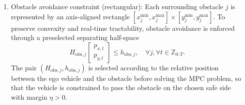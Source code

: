 \documentclass[pdflatex,sn-mathphys,Numbered]{sn-jnl}
\numberwithin{equation}{section}
\begin{document}
	\begin{enumerate}
		\item[i)] {Obstacle avoidance constraint (rectangular):}  
		Each surrounding obstacle \(j\) is represented by an axis-aligned rectangle
		\([
		x_j^{\min}, x_j^{\max}] \times [y_j^{\min}, y_j^{\max}]
		\).
		To preserve convexity and real-time tractability, obstacle avoidance is enforced through a preselected separating half-space
		\begin{equation}
			H_{\text{obs},j}
			\begin{bmatrix}
				p_{x,t} \\
				p_{y,t}
			\end{bmatrix}
			\le h_{\text{obs},j},
			\quad \forall j, \forall t \in \mathbb{Z}_{0:T}.
			\label{equ:sec2_obstacle_halfspace}
		\end{equation}
		The pair \((H_{\text{obs},j}, h_{\text{obs},j})\) is selected according to the relative position between the ego vehicle and the obstacle before solving the MPC problem, so that the vehicle is constrained to pass the obstacle on the chosen safe side with margin \(\eta > 0\).
		

\end{enumerate}
\end{document}
